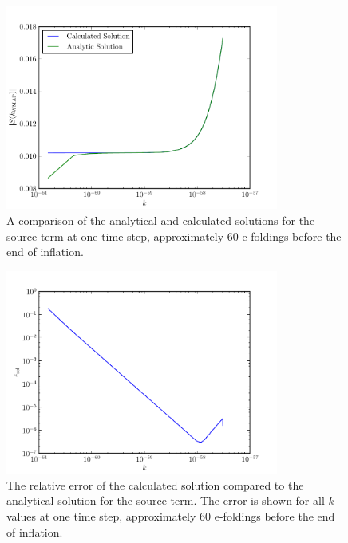 \begin{figure}
 \centering
 \includegraphics[width=0.8\textwidth]{numerical/graphs/analytic_v_calced_61beforeend-large}
 \caption[Comparison of Analytical and Calculated Source Terms]{A comparison of the
analytical and calculated solutions for the source term at one time step, approximately 60
e-foldings before the end of inflation.}
 \label{fig:analytic-61before-corr}
\end{figure}

\begin{figure}
 \centering
 \includegraphics[width=0.8\textwidth]{numerical/graphs/analytic_v_calced_61beforeend_errors-large}
 \caption[Relative Error Of Calculated Solution at One Time Step]{The relative error of the
calculated solution compared to the analytical solution for the source term. The error is shown
for all $k$ values at one time step, approximately 60 e-foldings before the end of inflation.}
 \label{fig:analytic-61before-errors-corr}
\end{figure}

